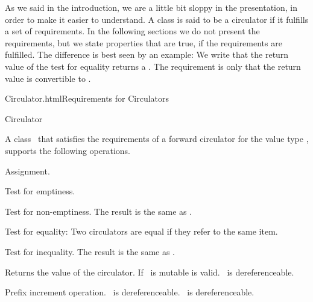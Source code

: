 \medskip

As we said in the introduction, we are a little bit sloppy in the
presentation, in order to make it easier to understand.  A class is
said to be a circulator if it fulfills a set of requirements.  In the
following sections we do not present the requirements, but we state
properties that are true, if the requirements are fulfilled.  The
difference is best seen by an example: We write that the return value
of the test for equality returns a . The requirement is
only that the return value is convertible to .


\begin{ccHtmlClassFile}{Circulator.html}{Requirements for Circulators}
\begin{ccClass}{Circulator}


\ccDefinition

A class \ccClassName\ that satisfies the requirements of a forward circulator
for the value type , supports the following operations.

\ccCreation
{}
\ccPropagateThreeToTwoColumns

{}

{}

\ccOperations

{Assignment.}

{Test for emptiness.}

{Test for non-emptiness. The result is the same as .}

{Test for equality: Two circulators are equal if they refer to the same item.}

{Test for inequality. The result is the same as .}

{Returns the value of the circulator.
 If \ccClassName\ is mutable  is valid.
 \ccPrecond \ccVar\ is dereferenceable.}

{Prefix increment operation.
\ccPrecond \ccVar\ is dereferenceable. \ccPostcond \ccVar\ is dereferenceable.}


\end{ccClass}
\end{ccHtmlClassFile}
